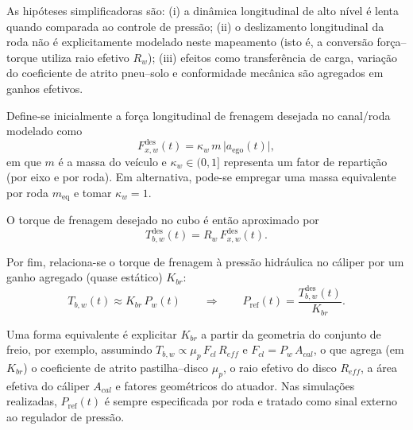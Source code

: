 As hipóteses simplificadoras são: (i) a dinâmica longitudinal de alto nível é lenta quando comparada ao controle de pressão; (ii) o deslizamento longitudinal da roda não é explicitamente modelado neste mapeamento (isto é, a conversão força--torque utiliza raio efetivo $R_w$); (iii) efeitos como transferência de carga, variação do coeficiente de atrito pneu--solo e conformidade mecânica são agregados em ganhos efetivos.

Define-se inicialmente a força longitudinal de frenagem desejada no canal/roda modelado como
\begin{equation}
    F_{x,w}^{\mathrm{des}}(t) = \kappa_w\, m\,\big|a_{\mathrm{ego}}(t)\big|,
    \label{eq:mapeamento_aref_forca}
\end{equation}
em que $m$ é a massa do veículo e $\kappa_w\in(0,1]$ representa um fator de repartição (por eixo e por roda). Em alternativa, pode-se empregar uma massa equivalente por roda $m_{\mathrm{eq}}$ e tomar $\kappa_w=1$.

O torque de frenagem desejado no cubo é então aproximado por
\begin{equation}
    T_{b,w}^{\mathrm{des}}(t) = R_w\,F_{x,w}^{\mathrm{des}}(t).
    \label{eq:mapeamento_aref_torque}
\end{equation}

Por fim, relaciona-se o torque de frenagem à pressão hidráulica no cáliper por um ganho agregado (quase estático) $K_{br}$:
\begin{equation}
    T_{b,w}(t) \approx K_{br}\,P_w(t)
    \qquad\Rightarrow\qquad
    P_{\mathrm{ref}}(t) = \frac{T_{b,w}^{\mathrm{des}}(t)}{K_{br}}.
    \label{eq:mapeamento_aref_pressao}
\end{equation}

Uma forma equivalente é explicitar $K_{br}$ a partir da geometria do conjunto de freio, por exemplo, assumindo $T_{b,w}\propto \mu_p\,F_{cl}\,R_{eff}$ e $F_{cl}=P_w\,A_{cal}$, o que agrega (em $K_{br}$) o coeficiente de atrito pastilha--disco $\mu_p$, o raio efetivo do disco $R_{eff}$, a área efetiva do cáliper $A_{cal}$ e fatores geométricos do atuador. Nas simulações realizadas, $P_{\mathrm{ref}}(t)$ é sempre especificada por roda e tratado como sinal externo ao regulador de pressão.

